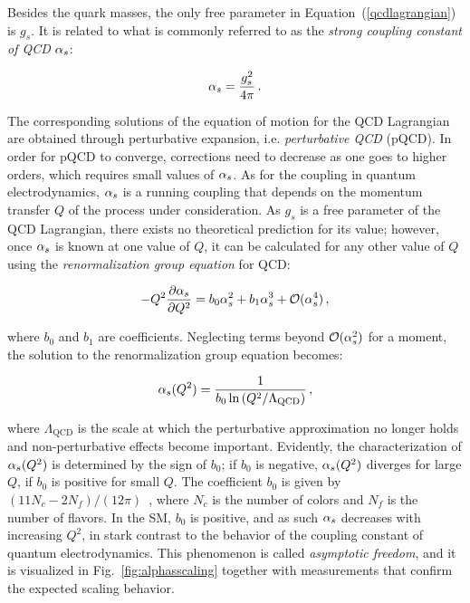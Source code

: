 Besides the quark masses, the only free parameter in Equation~(\ref{qcdlagrangian}) is $g_s$.
% 
It is related to what is commonly referred to as the \textit{strong coupling constant of QCD} $\alpha_s$:
% 
\begin{linenomath*}
\begin{equation}
\alpha_s = \frac{g_s^2}{4\pi}
\,.
\end{equation}
\end{linenomath*}
% 
The corresponding solutions of the equation of motion for the QCD Lagrangian are obtained through perturbative expansion, i.e. \textit{perturbative QCD} (pQCD).
% 
In order for pQCD to converge, corrections need to decrease as one goes to higher orders, which requires small values of $\alpha_s$.
% 
As for the coupling in quantum electrodynamics, $\alpha_s$ is a running coupling that depends on the momentum transfer $Q$ of the process under consideration.
% 
As $g_s$ is a free parameter of the QCD Lagrangian, there exists no theoretical prediction for its value; however, once $\alpha_s$ is known at one value of $Q$, it can be calculated for any other value of $Q$ using the \textit{renormalization group equation} for QCD:
% 
\begin{linenomath*}
\begin{equation}
- Q^2 \frac{\partial\alpha_s}{\partial Q^2} = b_0 \alpha_s^2 + b_1 \alpha_s^3 + \mathcal{O}(\alpha_s^4)
\,,
\end{equation}
\end{linenomath*}
% 
where $b_0$ and $b_1$ are coefficients.
% 
Neglecting terms beyond $\mathcal{O}(\alpha_s^2)$ for a moment, the solution to the renormalization group equation becomes:
% 
\begin{linenomath*}
\begin{equation}
\alpha_s(Q^2) = \frac{1}{b_0 \ln \left( Q^2 / \Lambda_\text{QCD} \right)}
\,,
\end{equation}
\end{linenomath*}
% 
where $\Lambda_\text{QCD}$ is the scale at which the perturbative approximation no longer holds and non-perturbative effects become important.
% 
Evidently, the characterization of $\alpha_s(Q^2)$ is determined by the sign of $b_0$; if $b_0$ is negative, $\alpha_s(Q^2)$ diverges for large $Q$, if $b_0$ is positive for small $Q$.
% 
The coefficient $b_0$ is given by $(11 N_c - 2 N_f) / (12\pi)$~\cite{Dissertori:2015tfa}, where $N_c$ is the number of colors and $N_f$ is the number of flavors.
% 
In the SM, $b_0$ is positive, and as such $\alpha_s$ decreases with increasing $Q^2$, in stark contrast to the behavior of the coupling constant of quantum electrodynamics.
% 
This phenomenon is called \textit{asymptotic freedom}, and it is visualized in Fig.~\ref{fig:alphasscaling} together with measurements that confirm the expected scaling behavior.

